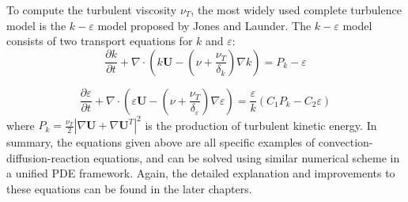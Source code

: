 To compute the turbulent viscosity $\nu_T$, the most widely used complete turbulence model is the $k-\varepsilon$ model proposed by Jones and Launder\cite{JonesPrediction1972}. The $k-\varepsilon$ model consists of two transport equations for $k$ and $\varepsilon$:
\begin{equation} 
\frac{\partial k}{\partial t}
+\nabla\cdot(k\mathbf{U}
-(\nu+\frac{\nu_T}{\delta_k})\nabla k) 
= P_k - \varepsilon
\end{equation}

\begin{equation} 
\frac{\partial
\varepsilon}{\partial t}+\nabla\cdot(\varepsilon \mathbf{U}
-(\nu+\frac{\nu_T}{\delta_\varepsilon})\nabla \varepsilon)
=\frac{\varepsilon}{k}(C_1P_k-C_2\varepsilon) \label{eq:eps_eqn} \end{equation}
where $P_k = \frac{\nu_T}{2}|\nabla \mathbf{U} + \nabla \mathbf{U}^T|^2$ is the production of turbulent kinetic energy. In summary, the equations given above are all specific examples of convection-diffusion-reaction equations, and can be solved using similar numerical scheme in a unified PDE framework. Again, the detailed explanation and improvements to these equations can be found in the later chapters.

